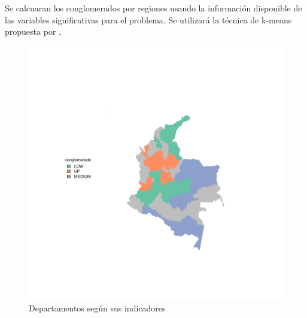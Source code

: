 \documentclass{article}
\begin{document}
Se calcuaran los conglomerados por regiones usando la información disponible de las variables significativas para el problema. Se utilizará la técnica de k-means propuesta por \cite{macqueen_methods_nodate}.




\begin{figure}[h]
\centering
\begin{adjustbox}{width=12cm,height=12cm,clip,trim=0cm 0cm 0cm 0cm}
\includegraphics{ProyectoFinal-plotMap1}
\end{adjustbox}
\caption{Departamentos según sus indicadores}\label{clustmap}
\end{figure}




\end{document}
